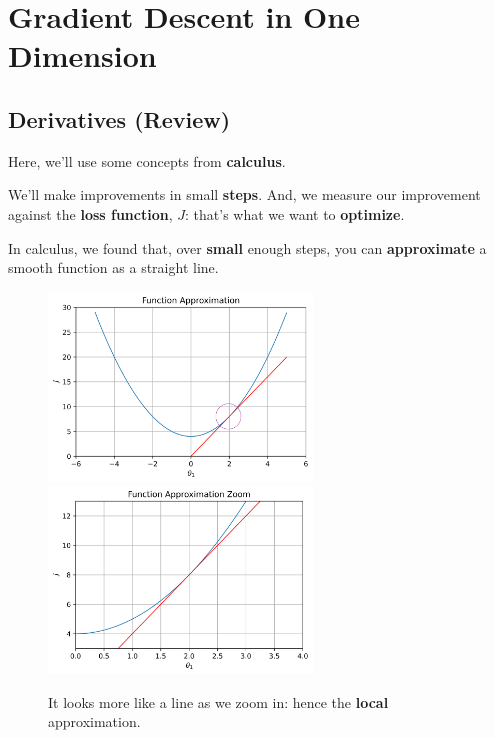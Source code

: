        
        

        
\pagebreak

\section{Gradient Descent in One Dimension}

    \subsection{Derivatives (Review)}
    
        Here, we'll use some concepts from \textbf{calculus}.
        
        We'll make improvements in small \textbf{steps}. And, we measure our improvement against the \textbf{loss function}, $J$: that's what we want to \textbf{optimize}.
        
        In calculus, we found that, over \textbf{small} enough steps, you can \textbf{approximate} a smooth function as a straight line.\\
        
        \begin{figure}[H]
            \includegraphics[width=70mm,scale=0.5]{images/gradient_descent_images/function_approximation_linear.png}
            \includegraphics[width=70mm,scale=0.5]{images/gradient_descent_images/function_approximation_linear_zoom.png}
            
            \caption*{It looks more like a line as we zoom in: hence the \textbf{local} approximation.}
        \end{figure}
        
